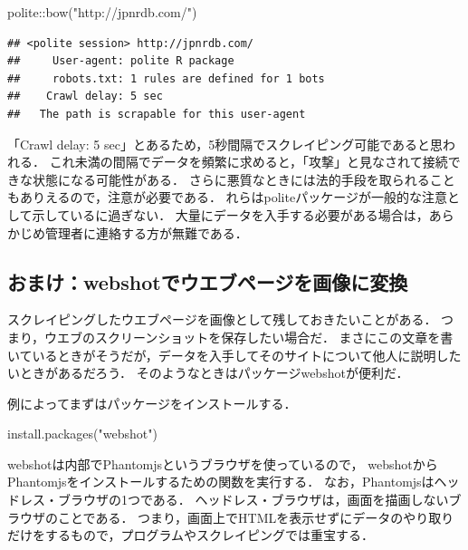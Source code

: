 \documentclass[
]{article}
\newenvironment{Shaded}{\begin{snugshade}}{\end{snugshade}}
\newcommand{\FunctionTok}[1]{\textcolor[rgb]{0.00,0.00,0.00}{#1}}
\newcommand{\NormalTok}[1]{#1}
\newcommand{\SpecialCharTok}[1]{\textcolor[rgb]{0.00,0.00,0.00}{#1}}
\newcommand{\StringTok}[1]{\textcolor[rgb]{0.31,0.60,0.02}{#1}}
\begin{document}
\begin{Shaded}
\begin{Highlighting}[]
\NormalTok{polite}\SpecialCharTok{::}\FunctionTok{bow}\NormalTok{(}\StringTok{"http://jpnrdb.com/"}\NormalTok{)}
\end{Highlighting}
\end{Shaded}

\begin{verbatim}
## <polite session> http://jpnrdb.com/
##     User-agent: polite R package
##     robots.txt: 1 rules are defined for 1 bots
##    Crawl delay: 5 sec
##   The path is scrapable for this user-agent
\end{verbatim}

「Crawl delay: 5 sec」とあるため，5秒間隔でスクレイピング可能であると思われる．
これ未満の間隔でデータを頻繁に求めると，「攻撃」と見なされて接続できな状態になる可能性がある．
さらに悪質なときには法的手段を取られることもありえるので，注意が必要である．
れらはpoliteパッケージが一般的な注意として示しているに過ぎない．
大量にデータを入手する必要がある場合は，あらかじめ管理者に連絡する方が無難である．

\hypertarget{webshot}{%
\subsection{おまけ：webshotでウエブページを画像に変換}\label{webshot}}

スクレイピングしたウエブページを画像として残しておきたいことがある．
つまり，ウエブのスクリーンショットを保存したい場合だ．
まさにこの文章を書いているときがそうだが，データを入手してそのサイトについて他人に説明したいときがあるだろう．
そのようなときはパッケージwebshotが便利だ．

例によってまずはパッケージをインストールする．

\begin{Shaded}
\begin{Highlighting}[]
\FunctionTok{install.packages}\NormalTok{(}\StringTok{"webshot"}\NormalTok{)}
\end{Highlighting}
\end{Shaded}

webshotは内部でPhantomjsというブラウザを使っているので，
webshotからPhantomjsをインストールするための関数を実行する．
なお，Phantomjsはヘッドレス・ブラウザの1つである．
ヘッドレス・ブラウザは，画面を描画しないブラウザのことである．
つまり，画面上でHTMLを表示せずにデータのやり取りだけをするもので，プログラムやスクレイピングでは重宝する．
\end{document}

